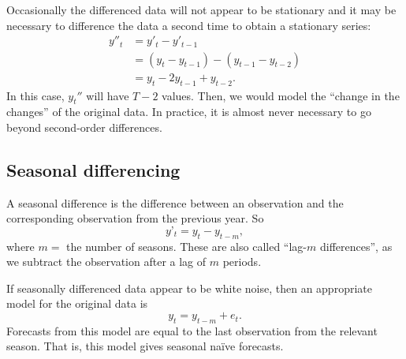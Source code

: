 \documentclass[]{book}
\newenvironment{Shaded}{\begin{snugshade}}{\end{snugshade}}
\newcommand{\DataTypeTok}[1]{\textcolor[rgb]{0.13,0.29,0.53}{#1}}
\newcommand{\DecValTok}[1]{\textcolor[rgb]{0.00,0.00,0.81}{#1}}
\newcommand{\KeywordTok}[1]{\textcolor[rgb]{0.13,0.29,0.53}{\textbf{#1}}}
\newcommand{\NormalTok}[1]{#1}
\newcommand{\OperatorTok}[1]{\textcolor[rgb]{0.81,0.36,0.00}{\textbf{#1}}}
\newcommand{\OtherTok}[1]{\textcolor[rgb]{0.56,0.35,0.01}{#1}}
\newcommand{\StringTok}[1]{\textcolor[rgb]{0.31,0.60,0.02}{#1}}
\begin{document}
Occasionally the differenced data will not appear to be stationary and it may be necessary to difference the data a second time to obtain a stationary series:
\begin{align*}
  y''_{t}  &=  y'_{t}  - y'_{t - 1} \\
           &= (y_t - y_{t-1}) - (y_{t-1}-y_{t-2})\\
           &= y_t - 2y_{t-1} +y_{t-2}.
\end{align*}
In this case, \(y_t''\) will have \(T-2\) values. Then, we would model the ``change in the changes'' of the original data. In practice, it is almost never necessary to go beyond second-order differences.

\hypertarget{seasonal-differencing}{%
\subsection*{Seasonal differencing}\label{seasonal-differencing}}

A seasonal difference is the difference between an observation and the corresponding observation from the previous year. So
\[
  y’_t = y_t - y_{t-m},
\]
where \(m=\) the number of seasons. These are also called ``lag-\(m\) differences'', as we subtract the observation after a lag of \(m\) periods.

If seasonally differenced data appear to be white noise, then an appropriate model for the original data is
\[
  y_t = y_{t-m}+e_t.
\]
Forecasts from this model are equal to the last observation from the relevant season. That is, this model gives seasonal naïve forecasts.

\begin{Shaded}
\end{Shaded}
\end{document}
